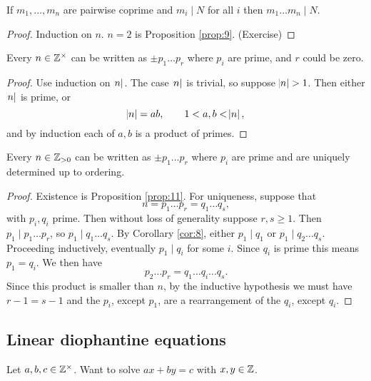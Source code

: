 \begin{corollary}
\label{cor:10}
If $ m_1, \dots, m_n $ are pairwise coprime and $ m_i \mid N $ for all $ i $ then $ m_1 \dots m_n \mid N $.
\end{corollary}

\begin{proof}
Induction on $ n $. $ n = 2 $ is Proposition \ref{prop:9}. (Exercise)
\end{proof}

\begin{proposition}
\label{prop:11}
Every $ n \in \mathbb{Z}^\times $ can be written as $ \pm p_1 \dots p_r $ where $ p_i $ are prime, and $ r $ could be zero.
\end{proposition}

\begin{proof}
Use induction on $ \abs{n} $. The case $ \abs{n} $ is trivial, so suppose $ \abs{n} > 1 $. Then either $ \abs{n} $ is prime, or
$$ \abs{n} = ab, \qquad 1 < a, b < \abs{n}, $$
and by induction each of $ a, b $ is a product of primes.
\end{proof}

\begin{theorem}
Every $ n \in \mathbb{Z}_{> 0} $ can be written as $ \pm p_1 \dots p_r $ where $ p_i $ are prime and are uniquely determined up to ordering.
\end{theorem}

\begin{proof}
Existence is Proposition \ref{prop:11}. For uniqueness, suppose that
$$ n = p_1 \dots p_r = q_1 \dots q_s, $$
with $ p_i, q_i $ prime. Then without loss of generality suppose $ r, s \ge 1 $. Then $ p_1 \mid p_1 \dots p_r $, so $ p_1 \mid q_1 \dots q_s $. By Corollary \ref{cor:8}, either $ p_1 \mid q_1 $ or $ p_1 \mid q_2 \dots q_s $. Proceeding inductively, eventually $ p_1 \mid q_i $ for some $ i $. Since $ q_i $ is prime this means $ p_1 = q_i $. We then have
$$ p_2 \dots p_r = q_1 \dots q_i \dots q_s. $$
Since this product is smaller than $ n $, by the inductive hypothesis we must have $ r - 1 = s - 1 $ and the $ p_i $, except $ p_1 $, are a rearrangement of the $ q_i $, except $ q_i $.
\end{proof}

\pagebreak

\subsection{Linear diophantine equations}

Let $ a, b, c \in \mathbb{Z}^\times $. Want to solve $ ax + by = c $ with $ x, y \in \mathbb{Z} $.

